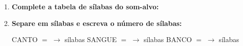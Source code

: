 \begin{exercicio}
\begin{enumerate}[resume]
  \item \textbf{Complete a tabela de sílabas do som-alvo:}

\begin{center}
\end{center}

  \item \textbf{Separe em sílabas e escreva o número de sílabas:}
  \begin{center}
  CANTO $=$ \underline{\hspace{1.2cm}} $\rightarrow$ \underline{\hspace{0.8cm}} sílabas \quad SANGUE $=$ \underline{\hspace{1.2cm}} $\rightarrow$ \underline{\hspace{0.8cm}} sílabas \quad BANCO $=$ \underline{\hspace{1.2cm}} $\rightarrow$ \underline{\hspace{0.8cm}} sílabas
  \end{center}

\end{enumerate}

\end{exercicio}



